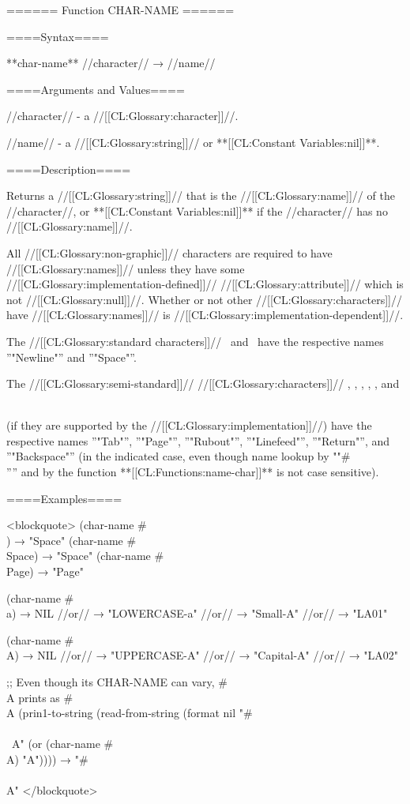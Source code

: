 ====== Function CHAR-NAME ======

====Syntax====

**char-name** //character// → //name//

====Arguments and Values====

//character// - a //[[CL:Glossary:character]]//.

//name// - a //[[CL:Glossary:string]]// or **[[CL:Constant Variables:nil]]**.

====Description====

Returns a //[[CL:Glossary:string]]// that is the //[[CL:Glossary:name]]// of the //character//, or **[[CL:Constant Variables:nil]]** if the //character// has no //[[CL:Glossary:name]]//.

All //[[CL:Glossary:non-graphic]]// characters are required to have //[[CL:Glossary:names]]// unless they have some //[[CL:Glossary:implementation-defined]]// //[[CL:Glossary:attribute]]// which is not //[[CL:Glossary:null]]//. Whether or not other //[[CL:Glossary:characters]]// have //[[CL:Glossary:names]]// is //[[CL:Glossary:implementation-dependent]]//.

The //[[CL:Glossary:standard characters]]// \NewlineChar\ and \SpaceChar\ have the respective names ''"Newline"'' and ''"Space"''.

The //[[CL:Glossary:semi-standard]]// //[[CL:Glossary:characters]]// \TabChar, \PageChar, \RuboutChar, \LinefeedChar, \ReturnChar, and \BackspaceChar\

(if they are supported by the //[[CL:Glossary:implementation]]//) have the respective names ''"Tab"'', ''"Page"'', ''"Rubout"'', ''"Linefeed"'', ''"Return"'', and ''"Backspace"'' (in the indicated case, even though name lookup by ""#\\'''' and by the function **[[CL:Functions:name-char]]** is not case sensitive).

====Examples====

<blockquote> (char-name #\\ ) → "Space" (char-name #\\Space) → "Space" (char-name #\\Page) → "Page"

(char-name #\\a) → NIL //or// → "LOWERCASE-a" //or// → "Small-A" //or// → "LA01"

(char-name #\\A) → NIL //or// → "UPPERCASE-A" //or// → "Capital-A" //or// → "LA02"

;; Even though its CHAR-NAME can vary, #\\A prints as #\\A (prin1-to-string (read-from-string (format nil "#\\\\~A" (or (char-name #\\A) "A")))) → "#\\\\A" </blockquote>

